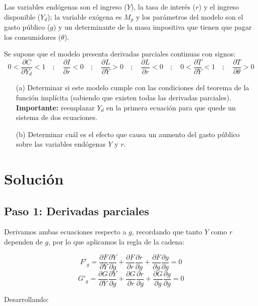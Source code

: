 \documentclass{article}
\begin{document}
Las variables endógenas son el ingreso ($Y$), la tasa de interés ($r$) y el ingreso disponible ($Y_d$);  
la variable exógena es $M_p$ y los parámetros del modelo son el gasto público ($g$) y un determinante de la masa impositiva que tienen que pagar los consumidores ($\theta$).

\medskip

Se supone que el modelo presenta derivadas parciales continuas con signos:
\[
0 < \frac{\partial C}{\partial Y_d} < 1
\quad ; \quad
\frac{\partial I}{\partial r} < 0
\quad ; \quad
\frac{\partial L}{\partial Y} > 0
\quad ; \quad
\frac{\partial L}{\partial r} < 0
\quad ; \quad
0 < \frac{\partial T}{\partial Y} < 1
\quad ; \quad
\frac{\partial T}{\partial \theta} > 0
\]

\bigskip

\begin{enumerate}
\item[(a)] Determinar si este modelo cumple con las condiciones del teorema de la función implícita (sabiendo que existen todas las derivadas parciales).  
\textbf{Importante:} reemplazar $Y_d$ en la primera ecuación para que quede un sistema de dos ecuaciones.

\item[(b)] Determinar cuál es el efecto que causa un aumento del gasto público sobre las variables endógenas $Y$ y $r$.
\end{enumerate}
\newpage
\section*{Solución}

\subsection*{Paso 1: Derivadas parciales}

Derivamos ambas ecuaciones respecto a \(g\), recordando que tanto \(Y\) como \(r\) dependen de \(g\), por lo que aplicamos la regla de la cadena:

\[
F'_g = \frac{\partial F}{\partial Y} \frac{\partial Y}{\partial g} + \frac{\partial F}{\partial r} \frac{\partial r}{\partial g} + \frac{\partial F}{\partial g} \frac{\partial g}{\partial g} = 0
\]
\[
G'_g = \frac{\partial G}{\partial Y} \frac{\partial Y}{\partial g} + \frac{\partial G}{\partial r} \frac{\partial r}{\partial g} + \frac{\partial G}{\partial g} \frac{\partial g}{\partial g} = 0
\]

Desarrollando:
\end{document}
